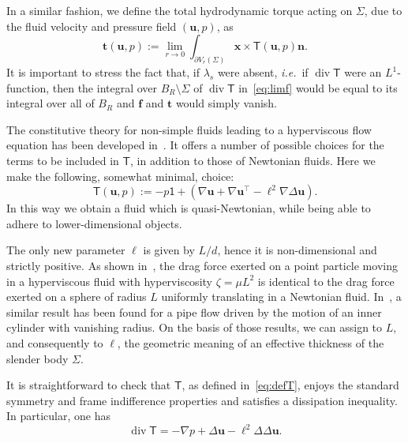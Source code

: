 \documentclass[final]{amsart}
\theoremstyle{definition}
\theoremstyle{definition}
\theoremstyle{remark}
\begin{document}
In a similar fashion, we define the total hydrodynamic torque acting
on ${\Sigma}$, due to the fluid velocity and pressure field $({\boldsymbol u},p)$, as
\begin{equation*}
{\boldsymbol t}({\boldsymbol u},p):=\lim_{r\to 0}\int_{{\partial} V_r({\Sigma})}{\boldsymbol x}\times{\mathsf T}({\boldsymbol u},p){\boldsymbol n}.
\end{equation*}
It is important to stress the fact that, if $\lambda_s$ were absent,
{\em i.e.}\ if ${\operatorname{\mathrm{div}}} {\mathsf T}$ were an $L^1$-function, then the integral
over $B_R\setminus{\Sigma}$ of ${\operatorname{\mathrm{div}}}{\mathsf T}$ in~\eqref{eq:limf} would be
equal to its integral over all of $B_R$ and ${\boldsymbol f}$ and ${\boldsymbol t}$ would
simply vanish. 

\null

The constitutive theory for non-simple fluids leading to a
hyperviscous flow equation has been developed
in~\cite{FriGur06,Mus09,GiuMar11}. It offers a number of possible
choices for the terms to be included in ${\mathsf T}$, in addition to those
of Newtonian fluids. Here we make the following, somewhat minimal, choice:
\begin{equation}\label{eq:defT}
{\mathsf T}({\boldsymbol u},p):=-p{\mathsf 1}+\left(\nabla{\boldsymbol u}+\nabla{\boldsymbol u}^{\intercal}-\ell^2\nabla{\Delta}{\boldsymbol u}\right).
\end{equation}
In this way we obtain a fluid which is quasi-Newtonian, while being
able to adhere to lower-dimensional objects. 

The only new parameter $\ell$ is given by $L/d$, hence it is
non-dimensional and strictly positive.  As shown
in~\cite[Sec.~2.1]{GiuFri12}, the drag force exerted on a point
particle moving in a hyperviscous fluid with hyperviscosity $\zeta=\mu
L^2$ is identical to the drag force exerted on a sphere of radius $L$
uniformly translating in a Newtonian fluid.
In~\cite[Sec.~3]{GiuMar10}, a similar result has been found for a pipe
flow driven by the motion of an inner cylinder with vanishing radius.
On the basis of those results, we can assign to $L$, and consequently
to $\ell$, the geometric meaning of an effective thickness of the
slender body ${\Sigma}$.

It is straightforward to check that ${\mathsf T}$, as defined
in~\eqref{eq:defT}, enjoys the standard symmetry and frame
indifference properties and satisfies a dissipation inequality. In
particular, one has
\begin{equation*}
{\operatorname{\mathrm{div}}} {\mathsf T} = -\nabla p + \Delta {\boldsymbol u} -\ell^2\Delta\Delta {\boldsymbol u}.
\end{equation*}
\end{document}
